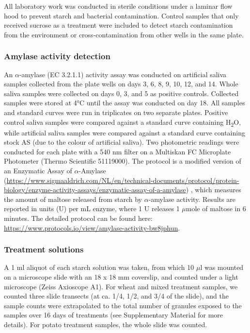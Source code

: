 \documentclass[utf8]{../templates/frontiersSCNS}
\begin{document}
All laboratory work was conducted in sterile conditions under a laminar flow hood
to prevent starch and bacterial contamination. Control samples that only received
sucrose as a treatment were included to detect starch contamination from the
environment or cross-contamination from other wells in the same plate.

\subsubsection{Amylase activity detection}\label{amylase-activity-detection}

An \(\alpha\)-amylase (EC 3.2.1.1) activity assay was conducted on artificial
saliva samples collected from the plate wells on days 3, 6, 8, 9, 10, 12, and 14.
Whole saliva samples were collected on days 0, 3, and 5 as positive controls.
Collected samples were stored at 4°C until the assay was conducted on day 18.
All samples and standard curves were run in triplicates on two separate plates.
Positive control saliva samples were compared against a standard curve containing
H\textsubscript{2}O, while artificial saliva samples were compared against a standard curve
containing stock AS (due to the colour of artificial saliva).
Two photometric readings were conducted for each plate with a 540 nm filter on a
Multiskan FC Microplate Photometer (Thermo Scientific 51119000).
The protocol is a modified version of an Enzymatic Assay of \(\alpha\)-Amylase
(\url{https://www.sigmaaldrich.com/NL/en/technical-documents/protocol/protein-biology/enzyme-activity-assays/enzymatic-assay-of-a-amylase}) \citep{bernfeldAmylase1955}, which measures the amount of
maltose released from starch by \(\alpha\)-amylase activity. Results are reported
in units (U) per mL enzyme, where 1 U releases 1 \(\mu\)mole of maltose in 6 minutes.
The detailed protocol can be found here: \url{https://www.protocols.io/view/amylase-activity-bw8jphun}.

\subsubsection{Treatment solutions}\label{treatment-solutions}

A 1 ml aliquot of each starch solution was taken, from which 10 \(\mu\)l was mounted
on a microscope slide with an 18 x 18 mm coverslip, and counted under a light microscope
(Zeiss Axioscope A1). For wheat and mixed treatment samples, we counted three
slide transects (at ca. 1/4, 1/2, and 3/4 of the slide), and the sample counts
were extrapolated to the total number of granules exposed to the samples over 16
days of treatments (see Supplementary Material for more details). For potato
treatment samples, the whole slide was counted.
\end{document}
